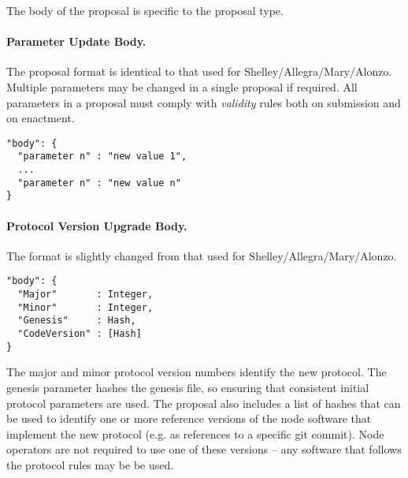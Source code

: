 The body of the proposal is specific to the proposal type.

\paragraph{Parameter Update Body.}  The proposal format is identical to that used for Shelley/Allegra/Mary/Alonzo.   Multiple parameters may be changed in a single proposal if required.
All parameters in a proposal must comply with \emph{validity} rules both on submission and on enactment.


\begin{verbatim}
"body": {
  "parameter n" : "new value 1",
  ...
  "parameter n" : "new value n"
}
\end{verbatim}

\paragraph{Protocol Version Upgrade Body.}  The format is slightly changed from that used for Shelley/Allegra/Mary/Alonzo.


\begin{verbatim}
"body": {
  "Major"       : Integer,
  "Minor"       : Integer,
  "Genesis"     : Hash,
  "CodeVersion" : [Hash]
}
\end{verbatim}

The major and minor protocol version numbers identify the new protocol.  The genesis parameter hashes the genesis file, so ensuring that consistent initial protocol parameters are used.
The proposal also includes a list of hashes that can be used to identify one or more reference versions of the node software that implement the new protocol (e.g. as references to a specific git commit).
Node operators are not required to use one of these versions -- any software that follows the protocol rules may be be used.

